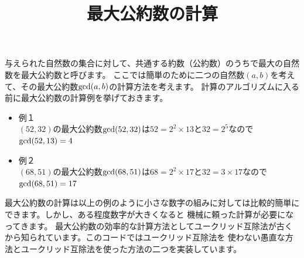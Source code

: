 \documentclass[dvipdfmx]{jarticle}
\title{最大公約数の計算}
\author{}
\date{}
\begin{document}
\maketitle
与えられた自然数の集合に対して、共通する約数（公約数）のうちで最大の自然数を最大公約数と呼びます。
ここでは簡単のために二つの自然数$(a,b)$を考えて、その最大公約数${\rm gcd}(a,b)$の計算方法を考えます。
計算のアルゴリズムに入る前に最大公約数の計算例を挙げておきます。
\begin{itemize}
\item 例１\\
	$(52,32)$の最大公約数${\rm gcd}(52,32)$は$52=2^{2}\times 13$と$32=2^5$なので${\rm gcd}(52,13)=4$
\item 例２\\
	$(68,51)$の最大公約数${\rm gcd}(68,51)$は$68=2^{2}\times 17$と$32=3\times 17$なので${\rm gcd}(68,51)=17$
\end{itemize}
最大公約数の計算は以上の例のように小さな数字の組みに対しては比較的簡単にできます。しかし、ある程度数字が大きくなると
機械に頼った計算が必要になってきます。
最大公約数の効率的な計算方法としてユークリッド互除法が古くから知られています。このコードではユークリッド互除法を
使わない愚直な方法とユークリッド互除法を使った方法の二つを実装しています。
\end{document}
